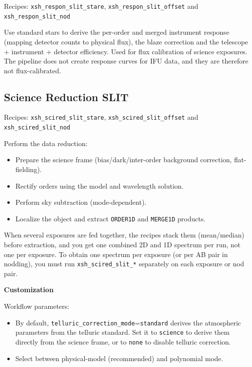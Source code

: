 Recipes: {\tt xsh\_respon\_slit\_stare}, {\tt xsh\_respon\_slit\_offset} and {\tt xsh\_respon\_slit\_nod}

Use standard stars to derive the per-order and merged instrument response 
(mapping detector counts to physical flux),
the blaze correction and the telescope + instrument + detector efficiency.
Used for flux calibration of science exposures. 
The pipeline does not create response curves for IFU data, and they are therefore
not flux-calibrated.

\subsection{Science Reduction SLIT}

Recipes: {\tt xsh\_scired\_slit\_stare}, {\tt xsh\_scired\_slit\_offset} and {\tt xsh\_scired\_slit\_nod}

Perform the data reduction: 
\begin{itemize}
\item Prepare the science frame (bias/dark/inter-order background correction, flat-fielding).
\item Rectify orders using the model and wavelength solution.
\item Perform sky subtraction (mode-dependent).
\item Localize the object and extract {\tt ORDER1D} and {\tt MERGE1D} products.
\end{itemize}

When several exposures are fed together, 
the recipes stack them (mean/median) before extraction, 
and you get one combined 2D and 1D spectrum per run, not one per exposure.
To obtain one spectrum per exposure (or per AB pair in nodding), 
you must run {\tt xsh\_scired\_slit\_*} separately on each exposure or nod pair.

\bigskip
{\bf Customization}
\bigskip

Workflow parameters:
\begin{itemize}
\item By default, {\tt telluric\_correction\_mode}={\tt standard} derives 
the atmospheric parameters from the telluric standard.
Set it to {\tt science} to derive them directly from the science frame, 
or to {\tt none} to disable telluric correction.
\item Select between physical-model (recommended) and polynomial mode.
\end{itemize}

